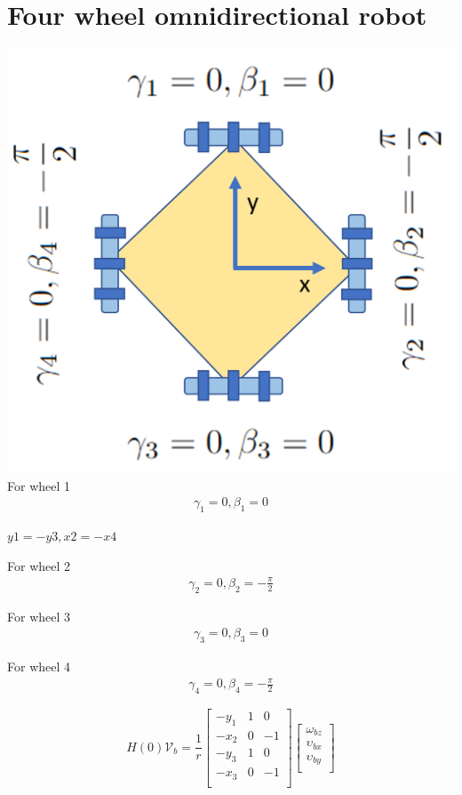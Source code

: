 \documentclass{article}
\begin{document}
\section{Four wheel omnidirectional robot}
\includegraphics{robot_4_wheel_kinematics.png}\\

For wheel 1
\begin{align*}
    \gamma_1 = 0, \beta_1 = 0
\end{align*}

$y1 = -y3, x2 = -x4$

For wheel 2
\begin{align*}
    \gamma_2 = 0, \beta_2 = - \frac{\pi}{2}
\end{align*}

For wheel 3
\begin{align*}
    \gamma_3 = 0, \beta_3 = 0
\end{align*}

For wheel 4
\begin{align*}
    \gamma_4 = 0, \beta_4 =  -\frac{\pi}{2}
\end{align*}

\begin{equation}
    H(0)\mathcal{V}_b = \frac{1}{r}
    \begin{bmatrix}
        -y_1 & 1 & 0  \\
        -x_2 & 0 & -1 \\
        -y_3 & 1 & 0  \\
        -x_3 & 0 & -1 \\
    \end{bmatrix}
    \begin{bmatrix}
        \omega_{bz}   \\
        \upsilon_{bx} \\
        \upsilon_{by} \\
    \end{bmatrix}
\end{equation}
\end{document}
